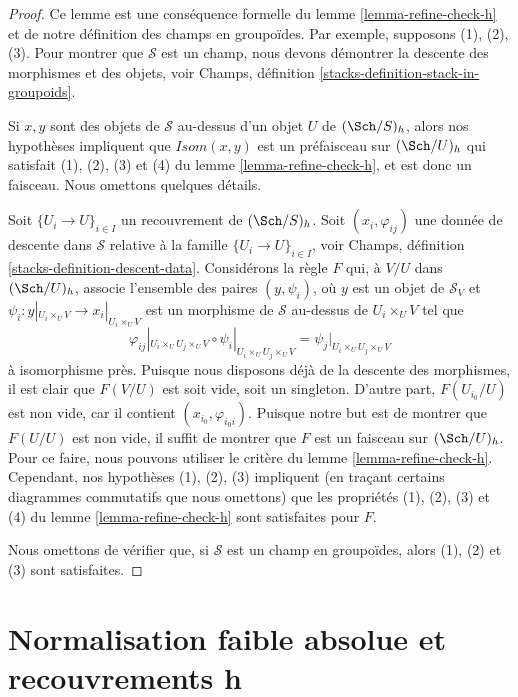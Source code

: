 \begin{proof}
Ce lemme est une conséquence formelle du lemme \ref{lemma-refine-check-h}
et de notre définition des champs en groupoïdes.
Par exemple, supposons (1), (2), (3). Pour montrer que
$\mathcal{S}$ est un champ, nous devons
démontrer la descente des morphismes et des objets, voir
Champs, définition \ref{stacks-definition-stack-in-groupoids}.

\medskip\noindent
Si $x, y$ sont des objets de $\mathcal{S}$ au-dessus d'un objet $U$ de
$(\Sch/S)_h$, alors nos hypothèses impliquent que $\mathit{Isom}(x, y)$
est un préfaisceau sur $(\Sch/U)_h$ qui satisfait
(1), (2), (3) et (4) du lemme \ref{lemma-refine-check-h},
et est donc un faisceau. Nous omettons quelques détails.

\medskip\noindent
Soit $\{U_i \to U\}_{i \in I}$ un recouvrement de $(\Sch/S)_h$.
Soit $(x_i, \varphi_{ij})$ une donnée de descente dans $\mathcal{S}$
relative à la famille $\{U_i \to U\}_{i \in I}$, voir
Champs, définition \ref{stacks-definition-descent-data}.
Considérons la règle $F$ qui, à $V/U$ dans $(\Sch/U)_h$, associe
l'ensemble des paires $(y, \psi_i)$, où $y$ est un objet de $\mathcal{S}_V$
et $\psi_i : y|_{U_i \times_U V} \to x_i|_{U_i \times_U V}$
est un morphisme de $\mathcal{S}$ au-dessus de $U_i \times_U V$
tel que
$$
\varphi_{ij}|_{U_i \times_U U_j \times_U V}
\circ
\psi_i|_{U_i \times_U U_j \times_U V}
=
\psi_j|_{U_i \times_U U_j \times_U V}
$$
à isomorphisme près. Puisque nous disposons déjà de la descente des morphismes, il est
clair que $F(V/U)$ est soit vide, soit un singleton. D'autre part,
$F(U_{i_0}/U)$ est non vide, car il contient
$(x_{i_0}, \varphi_{i_0i})$. Puisque notre but est de montrer que $F(U/U)$
est non vide, il suffit de montrer que $F$ est un faisceau sur $(\Sch/U)_h$.
Pour ce faire, nous pouvons utiliser le critère du lemme \ref{lemma-refine-check-h}.
Cependant, nos hypothèses (1), (2), (3) impliquent (en traçant certains
diagrammes commutatifs que nous omettons) que les propriétés (1), (2), (3) et (4)
du lemme \ref{lemma-refine-check-h} sont satisfaites pour $F$.

\medskip\noindent
Nous omettons de vérifier que, si $\mathcal{S}$ est un champ en groupoïdes,
alors (1), (2) et (3) sont satisfaites.
\end{proof}





\section{Normalisation faible absolue et recouvrements h}
\label{section-h-and-weak-normalization}

